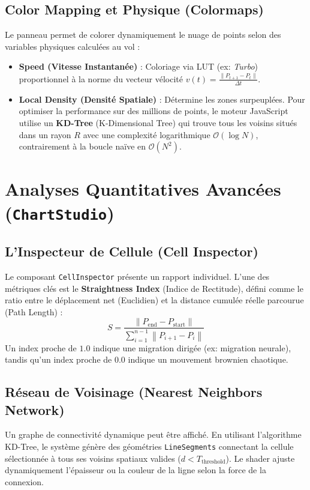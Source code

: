 \subsection{Color Mapping et Physique (Colormaps)}
Le panneau permet de colorer dynamiquement le nuage de points selon des variables physiques calculées au vol :
\begin{itemize}
    \item \textbf{Speed (Vitesse Instantanée)} : Coloriage via LUT (ex: \textit{Turbo}) proportionnel à la norme du vecteur vélocité $v(t) = \frac{\| P_{t+1} - P_{t} \|}{\Delta t}$.
    \item \textbf{Local Density (Densité Spatiale)} : Détermine les zones surpeuplées. Pour optimiser la performance sur des millions de points, le moteur JavaScript utilise un \textbf{KD-Tree} (K-Dimensional Tree) qui trouve tous les voisins situés dans un rayon $R$ avec une complexité logarithmique $\mathcal{O}(\log N)$, contrairement à la boucle naïve en $\mathcal{O}(N^2)$.
\end{itemize}

\section{Analyses Quantitatives Avancées (\texttt{ChartStudio})}

\subsection{L'Inspecteur de Cellule (Cell Inspector)}

Le composant \texttt{CellInspector} présente un rapport individuel. L'une des métriques clés est le \textbf{Straightness Index} (Indice de Rectitude), défini comme le ratio entre le déplacement net (Euclidien) et la distance cumulée réelle parcourue (Path Length) :
\begin{equation}
S = \frac{\left\| P_{\text{end}} - P_{\text{start}} \right\|}{\sum_{i=1}^{n-1} \left\| P_{i+1} - P_i \right\|}
\end{equation}
Un index proche de $1.0$ indique une migration dirigée (ex: migration neurale), tandis qu'un index proche de $0.0$ indique un mouvement brownien chaotique.

\subsection{Réseau de Voisinage (Nearest Neighbors Network)}
Un graphe de connectivité dynamique peut être affiché. En utilisant l'algorithme KD-Tree, le système génère des géométries \texttt{LineSegments} connectant la cellule sélectionnée à tous ses voisins spatiaux valides ($d < T_{\text{threshold}}$). Le shader ajuste dynamiquement l'épaisseur ou la couleur de la ligne selon la force de la connexion.
